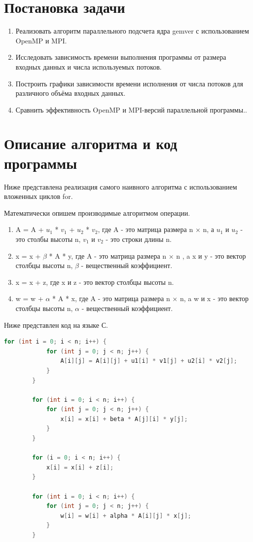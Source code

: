 \documentclass{article}
\begin{document}
\newpage

\section{Постановка задачи}

\begin{enumerate}
    \item {\large Реализовать алгоритм параллельного подсчета ядра gemver с использованием OpenMP и MPI.}
    \item {\large Исследовать зависимость времени выполнения программы от размера входных данных и числа используемых потоков}.
    \item {\large Построить графики зависимости времени исполнения от числа потоков для различного объёма входных данных}.
    \item {\large Сравнить эффективность OpenMP и MPI-версий параллельной программы.}.
\end{enumerate}

\section{Описание алгоритма и код программы}

{\large Ниже представлена реализация самого наивного алгоритма с использованием вложенных циклов for}.

{\large Математически опишем производимые алгоритмом операции.}
\begin{enumerate}
    \item A = A + $u_1$ * $v_1$ + $u_2$ * $v_2$, где A - это матрица размера n × n, а $u_1$ и $u_2$ - это столбы высоты n, $v_1$ и $v_2$ - это строки длины n.
    \item x = x + \(\beta\) * A * y, где A - это матрица размера n × n , a x и y - это вектор столбцы высоты n, \(\beta\) - вещественный коэффициент.
    \item x = x + z, где x и z - это вектор столбцы высоты n.
    \item w = w + \(\alpha\) * A * x, где A - это матрица размера n × n, a w и x - это вектор столбцы высоты n, \(\alpha\) - вещественный коэффициент.
\end{enumerate}

{\large Ниже представлен код на языке С.}

\vspace{0.5cm}
\begin{lstlisting}[language = C]
        for (int i = 0; i < n; i++) {
            for (int j = 0; j < n; j++) {
                A[i][j] = A[i][j] + u1[i] * v1[j] + u2[i] * v2[j];
            }
        }

        for (int i = 0; i < n; i++) {
            for (int j = 0; j < n; j++) {
                x[i] = x[i] + beta * A[j][i] * y[j];
            }
        }

        for (i = 0; i < n; i++) {
            x[i] = x[i] + z[i];
        }

        for (int i = 0; i < n; i++) {
            for (int j = 0; j < n; j++) {
                w[i] = w[i] + alpha * A[i][j] * x[j];
            }
        }
\end{lstlisting}
\end{document}

